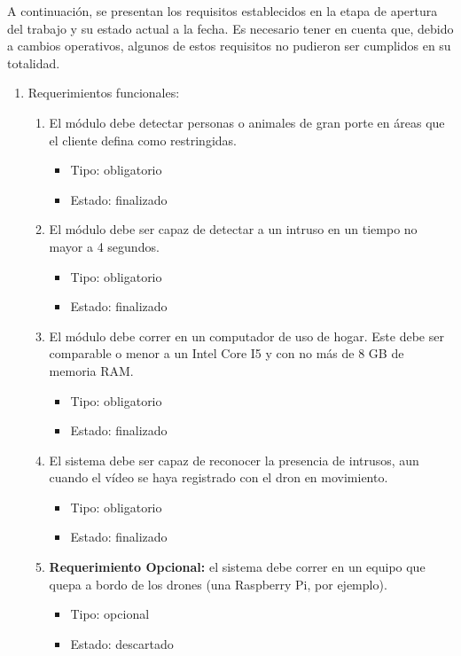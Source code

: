 A continuación, se presentan los requisitos establecidos en la etapa de apertura del trabajo y su estado actual a la fecha. Es necesario tener en cuenta que, debido a cambios operativos, algunos de estos requisitos no pudieron ser cumplidos en su totalidad. \\ 

\begin{enumerate}
\item Requerimientos funcionales:
\begin{enumerate}
	\item El módulo debe detectar personas o animales de gran porte en áreas que el cliente defina como restringidas.
	\begin{itemize}
		\item Tipo: obligatorio
		\item Estado: finalizado
	\end{itemize}
	\item El módulo debe ser capaz de detectar a un intruso en un tiempo no mayor a 4 segundos.
	\begin{itemize}
		\item Tipo: obligatorio
		\item Estado: finalizado
	\end{itemize}
	\item El módulo debe correr en un computador de uso de hogar. Este debe ser comparable o menor a un Intel Core I5 y con no más de 8 GB de memoria RAM.
	\begin{itemize}
		\item Tipo: obligatorio
		\item Estado: finalizado
	\end{itemize}
	\item El sistema debe ser capaz de reconocer la presencia de intrusos, aun cuando el vídeo se haya registrado con el dron en movimiento.
	\begin{itemize}
		\item Tipo: obligatorio
		\item Estado: finalizado
	\end{itemize}
	\item \textbf{Requerimiento Opcional:} el sistema debe correr en un equipo que quepa a bordo de los drones (una Raspberry Pi, por ejemplo). 
	\begin{itemize}
		\item Tipo: opcional
		\item Estado: descartado
	\end{itemize}
\end{enumerate}

\end{enumerate}
